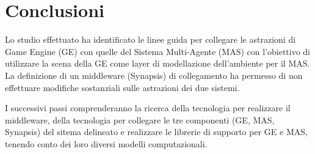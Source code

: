 \chapter{Conclusioni}

Lo studio effettuato ha identificato le linee guida per collegare le astrazioni di Game Engine (GE) con quelle del Sistema Multi-Agente (MAS) con l'obiettivo di utilizzare la scena della GE come layer di modellazione dell'ambiente per il MAS. La definizione di un middleware (Synapsis) di collegamento ha permesso di non effettuare modifiche sostanziali sulle astrazioni dei due sistemi.

\medskip

I successivi passi comprenderanno la ricerca della tecnologia per realizzare il middleware, della tecnologia per collegare le tre componenti (GE, MAS, Synapsis) del sitema delineato e realizzare le librerie di supporto per GE e MAS, tenendo conto dei loro diversi modelli computazionali. 

